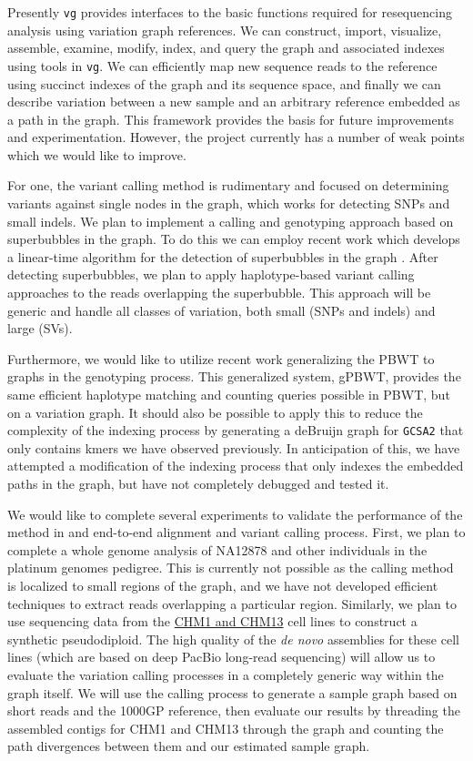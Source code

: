 \documentclass[12pt]{article}
\begin{document}
Presently {\tt vg} provides interfaces to the basic functions required for resequencing analysis using variation graph references.
We can construct, import, visualize, assemble, examine, modify, index, and query the graph and associated indexes using tools in {\tt vg}.
We can efficiently map new sequence reads to the reference using succinct indexes of the graph and its sequence space, and finally we can describe variation between a new sample and an arbitrary reference embedded as a path in the graph.
This framework provides the basis for future improvements and experimentation.
However, the project currently has a number of weak points which we would like to improve.

For one, the variant calling method is rudimentary and focused on determining variants against single nodes in the graph, which works for detecting SNPs and small indels.
We plan to implement a calling and genotyping approach based on superbubbles in the graph.
To do this we can employ recent work which develops a linear-time algorithm for the detection of superbubbles in the graph \cite{brankovic2016linear}.
After detecting superbubbles, we plan to apply haplotype-based variant calling approaches \cite{garrison2012haplotype} to the reads overlapping the superbubble.
This approach will be generic and handle all classes of variation, both small (SNPs and indels) and large (SVs).

Furthermore, we would like to utilize recent work generalizing the PBWT to graphs in the genotyping process.
This generalized system, gPBWT, provides the same efficient haplotype matching and counting queries possible in PBWT, but on a variation graph.
It should also be possible to apply this to reduce the complexity of the indexing process by generating a deBruijn graph for {\tt GCSA2} that only contains kmers we have observed previously.
In anticipation of this, we have attempted a modification of the indexing process that only indexes the embedded paths in the graph, but have not completely debugged and tested it.

We would like to complete several experiments to validate the performance of the method in and end-to-end alignment and variant calling process.
First, we plan to complete a whole genome analysis of NA12878 and other individuals in the platinum genomes pedigree.
This is currently not possible as the calling method is localized to small regions of the graph, and we have not developed efficient techniques to extract reads overlapping a particular region.
Similarly, we plan to use sequencing data from the \href{http://www.ncbi.nlm.nih.gov/assembly/706168/}{CHM1 and CHM13} cell lines to construct a synthetic pseudodiploid.
The high quality of the \emph{de novo} assemblies for these cell lines (which are based on deep PacBio long-read sequencing) will allow us to evaluate the variation calling processes in a completely generic way within the graph itself.
We will use the calling process to generate a sample graph based on short reads and the 1000GP reference, then evaluate our results by threading the assembled contigs for CHM1 and CHM13 through the graph and counting the path divergences between them and our estimated sample graph.
\end{document}
